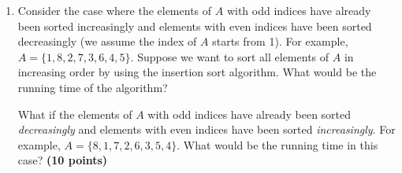 \documentclass{article}
\begin{document}
\begin{enumerate}[label=(\alph*)]



\item Consider the case where the elements of $A$ with odd indices have
already been sorted increasingly and elements with even indices have
been sorted decreasingly (we assume the index of $A$ starts from
1). For example, $A = \{1, 8, 2, 7, 3, 6, 4, 5\}$. Suppose we want to
sort all elements of $A$ in increasing order by using the insertion
sort algorithm. What would be the running time of the algorithm?

What if the elements of $A$ with odd indices have already been sorted
\emph{decreasingly} and elements with even indices have been sorted 
\emph{increasingly}. For example, $A = \{8, 1, 7, 2, 6, 3, 5,
4\}$. What would be the running time in this case?  {\bf (10 points)}


\end{enumerate}
\end{document}
